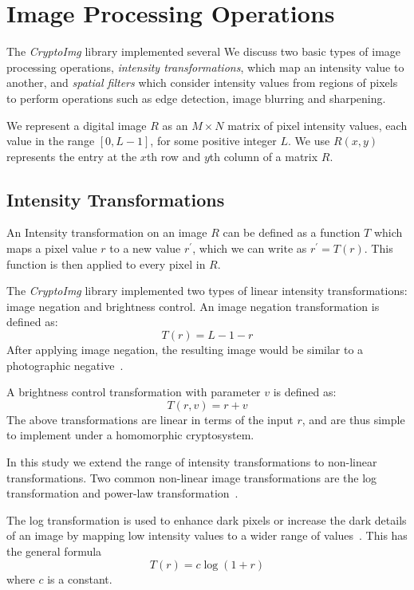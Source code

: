 \section{Image Processing Operations}
The \textit{CryptoImg} library implemented several
We discuss two basic types of image processing operations, \textit{intensity transformations}, which map an intensity value to another, and \textit{spatial filters} which consider intensity values from regions of pixels to perform operations such as edge detection, image blurring and sharpening.

We represent a digital image $R$ as an $M \times N$ matrix of pixel intensity values, each value in the range $\left[0, L-1\right]$, for some positive integer $L$. We use $R(x,y)$ represents the entry at the $x$th row and $y$th column of a matrix $R$.

\subsection{Intensity Transformations}
An Intensity transformation on an image $R$ can be defined as a function $T$ which maps a pixel value $r$ to a new value $r^\prime$, which we can write as $r^\prime = T\left(r\right)$. This function is then applied to every pixel in $R$.

The \textit{CryptoImg} library implemented two types of linear intensity transformations: image negation and brightness control.
An image negation transformation is defined as:
\begin{equation}
    T\left(r\right) = L-1-r
\end{equation}
After applying image negation, the resulting image would be similar to a photographic negative~\cite{gonzalez_digital_2008}.

A brightness control transformation with parameter $v$ is defined as:
\begin{equation}
    T\left(r,v\right) = r+v
\end{equation}
The above transformations are linear in terms of the input $r$, and are thus simple to implement under a homomorphic cryptosystem.

In this study we extend the range of intensity transformations to non-linear transformations. Two common non-linear image transformations are the log transformation and power-law transformation~\cite{gonzalez_digital_2008}.

The log transformation is used to enhance dark pixels or increase the dark details of an image by mapping low intensity values to a wider range of values~\cite{gonzalez_digital_2008}. This has the general formula
\begin{equation}
    T\left(r\right) = c \log\left(1 + r\right)
\end{equation}
where $c$ is a constant.

